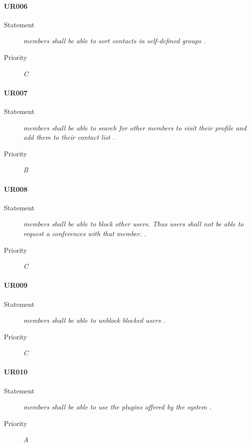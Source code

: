 \paragraph{UR006}
  \begin{description}
  \item [Statement] 
    \textit{ \gls{member}s shall be able to sort contacts in self-defined groups
    .}
  \item [Priority] \textit{C}
\end{description}

\paragraph{UR007}
  \begin{description}
  \item [Statement] 
    \textit{ \gls{member}s shall be able to search for other \gls{member}s to visit their profile and add them to their contact list
    .}
  \item [Priority] \textit{B}
\end{description}

\paragraph{UR008}
  \begin{description}
  \item [Statement] 
    \textit{ \gls{member}s shall be able to block other \gls{user}s.
            Thus \gls{user}s shall not be able to request a \gls{conference}s with that \gls{member}.
    .}
  \item [Priority] \textit{C}
\end{description}

\paragraph{UR009}
  \begin{description}
  \item [Statement] 
    \textit{ \gls{member}s shall be able to unblock blocked \gls{user}s
    .}
  \item [Priority] \textit{C}
\end{description}

\paragraph{UR010}
  \begin{description}
  \item [Statement] 
    \textit{ \gls{member}s shall be able to use the \gls{plugin}s offered by the system
    .}
  \item [Priority] \textit{A}
\end{description}

